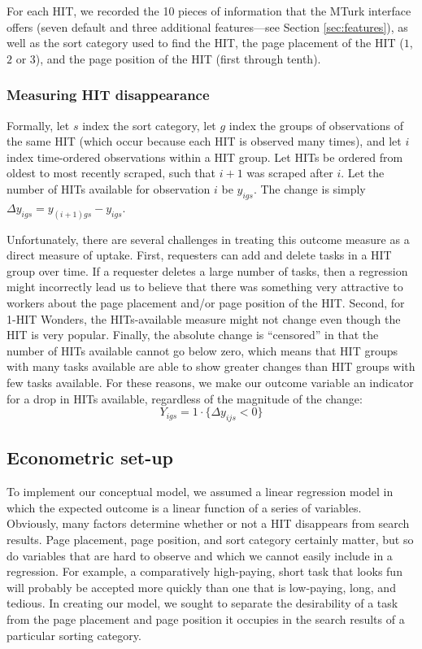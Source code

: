 \documentclass{sig-alternate}
\begin{document}
For each HIT, we recorded the 10 pieces of information that the MTurk
interface offers (seven default and three additional features---see
Section \ref{sec:features}), as well as the sort category used to find
the HIT, the page placement of the HIT ($1$, $2$ or $3$), and the page
position of the HIT (first through tenth).

\subsubsection{Measuring HIT disappearance}
Formally, let $s$ index the sort category, let $g$ index the groups of
observations of the same HIT (which occur because each HIT is observed
many times), and let $i$ index time-ordered observations within a HIT
group.  Let HITs be ordered from oldest to most recently scraped, such
that $i+1$ was scraped after $i$.  Let the number of HITs available
for observation $i$ be $y_{igs}$.  The change is simply $\Delta
y_{igs} = y_{(i+1)gs} - y_{igs}$.

Unfortunately, there are several challenges in treating this outcome
measure as a direct measure of uptake.  First, requesters can add and
delete tasks in a HIT group over time.  If a requester deletes a large
number of tasks, then a regression might incorrectly lead us to
believe that there was something very attractive to workers about the
page placement and/or page position of the HIT.  Second, for 1-HIT
Wonders, the HITs-available measure might not change even though the
HIT is very popular.  Finally, the absolute change is ``censored'' in
that the number of HITs available cannot go below zero, which means
that HIT groups with many tasks available are able to show greater
changes than HIT groups with few tasks available.  For these reasons,
we make our outcome variable an indicator for a drop in HITs
available, regardless of the magnitude of the change:
\[Y_{igs} = 1\cdot \{\Delta y_{ijs} < 0\} \]

\subsection{Econometric set-up}
To implement our conceptual model, we assumed a linear regression
model in which the expected outcome is a linear function of a series
of variables.  Obviously, many factors determine whether or not a HIT
disappears from search results.  Page placement, page position, and
sort category certainly matter, but so do variables that are hard to
observe and which we cannot easily include in a regression.  For
example, a comparatively high-paying, short task that looks fun will
probably be accepted more quickly than one that is low-paying, long,
and tedious.  In creating our model, we sought to separate the
desirability of a task from the page placement and page position it
occupies in the search results of a particular sorting category.
\end{document}
